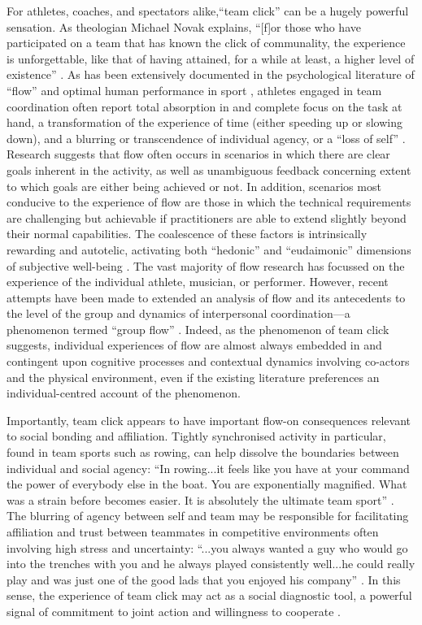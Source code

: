 For athletes, coaches, and spectators alike,``team click'' can be a hugely powerful sensation. As theologian Michael Novak explains, ``[f]or those who have participated on a team that has known the click of communality, the experience is unforgettable, like that of having attained, for a while at least, a higher level of existence'' \citep[11]{White2011}. As has been extensively documented in the psychological literature of ``flow'' \citep{Csikszentmihalyi1992} and optimal human performance in sport \citep{Jackson1999}, athletes engaged in team coordination often report total absorption in and complete focus on the task at hand, a transformation of the experience of time (either speeding up or slowing down), and a blurring or transcendence of individual agency, or a ``loss of self''   \citep{Csikszentmihalyi1992,Jackson1995,Jackson1999,McNeill1995}.  Research suggests that flow often occurs in scenarios in which there are clear goals inherent in the activity, as well as unambiguous feedback concerning extent to which goals are either being achieved or not.
In addition, scenarios most conducive to the experience of flow are those in which the technical requirements are challenging but achievable if practitioners are able to extend slightly beyond their normal capabilities\citep{Fong2015}.
The coalescence of these factors is intrinsically rewarding and autotelic\citep{Csikszentmihalyi1975}, activating both ``hedonic'' and ``eudaimonic'' dimensions of subjective well-being \citep{Huta2010,Fave2009}.  The vast majority of flow research has focussed on the experience of the individual athlete, musician, or performer.  However, recent attempts have been made to extended an analysis of flow and its antecedents to the level of the group and dynamics of interpersonal coordination---a phenomenon termed ``group flow'' \citep{Sawyer2006}. Indeed, as the phenomenon of team click suggests, individual experiences of flow are almost always embedded in and contingent upon cognitive processes and contextual dynamics involving co-actors and the physical environment, even if the existing literature preferences an individual-centred account of the phenomenon\citep{Kirsh2006,Marsh2009,Noy2015}.

Importantly, team click appears to have important flow-on consequences relevant to social bonding and affiliation. Tightly synchronised activity in particular, found in team sports such as rowing, can help dissolve the boundaries between individual and social agency: ``In rowing...it feels like you have at your command the power of everybody else in the boat. You are exponentially magnified. What was a strain before becomes easier. It is absolutely the ultimate team sport'' \citep{Brown2016}.
The blurring of agency between self and team may be responsible for facilitating affiliation and trust between teammates in competitive environments often involving high stress and uncertainty: ``...you always wanted a guy who would go into the trenches with you and he always played consistently well...he could really play and was just one of the good lads that you enjoyed his company'' \citep{Fox-Sports2017}. In this sense, the experience of team click may act as a social diagnostic tool, a powerful signal of commitment to joint action and willingness to cooperate \citep{Reddish2013a}.

